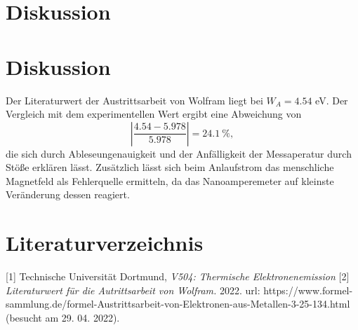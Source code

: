 \section{Diskussion}
\label{sec:Diskussion}
\section{Diskussion}
Der Literaturwert der Austrittsarbeit von Wolfram liegt bei $W_{A}=4.54$ eV. Der Vergleich mit dem experimentellen Wert ergibt eine Abweichung von
\begin{equation*}
  |\frac{4.54-5.978}{5.978}|=24.1\ \%,
\end{equation*}
die sich durch Ableseungenauigkeit und der Anfälligkeit der Messaperatur durch Stöße erklären lässt. Zusätzlich lässt sich beim Anlaufstrom das menschliche Magnetfeld als Fehlerquelle ermitteln, da das Nanoamperemeter auf kleinste Veränderung dessen reagiert.

\section{Literaturverzeichnis}
[1] Technische Universität Dortmund, \textit{V504: Thermische Elektronenemission}
[2] \textit{Literaturwert für die Autrittsarbeit von Wolfram.} 2022. url: https://www.formel-
sammlung.de/formel-Austrittsarbeit-von-Elektronen-aus-Metallen-3-25-134.html (besucht am 29. 04. 2022).
\newpage

